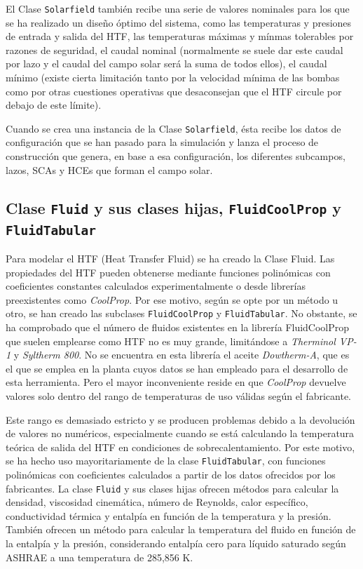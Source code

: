 El Clase \texttt{Solarfield} también recibe una serie de valores nominales para los que se ha realizado un diseño óptimo del sistema, como las temperaturas y presiones de entrada y salida del HTF, las temperaturas máximas y mínmas tolerables por razones de seguridad, el caudal nominal (normalmente se suele dar este caudal por lazo y el caudal del campo solar será la suma de todos ellos), el caudal mínimo (existe cierta limitación tanto por la velocidad mínima de las bombas como por otras
cuestiones operativas que desaconsejan que el HTF circule por debajo de este límite).

Cuando se crea una instancia de la Clase \texttt{Solarfield}, ésta recibe los datos de configuración que se han pasado para la simulación y lanza el proceso de construcción que genera, en base a esa configuración, los diferentes subcampos, lazos, SCAs y HCEs que forman el campo solar.

\subsection{Clase \texttt{Fluid} y sus clases hijas, \texttt{FluidCoolProp} y \texttt{FluidTabular}}
\label{subclases-fluid}

Para modelar el HTF (Heat Transfer Fluid) se ha creado la Clase Fluid. Las propiedades del HTF pueden obtenerse mediante funciones polinómicas con coeficientes constantes calculados experimentalmente o desde librerías preexistentes como \textit{CoolProp}. Por ese motivo, según se opte por un método u otro, se han creado las subclases \texttt{FluidCoolProp} y \texttt{FluidTabular}. No obstante, se ha comprobado que el número de fluidos existentes en la librería FluidCoolProp que suelen emplearse como HTF no es muy grande, limitándose a \emph{Therminol VP-1} y \emph{Syltherm 800}. No se encuentra en esta librería el aceite \emph{Dowtherm-A}, que es el que se emplea en la planta cuyos datos se han empleado para el desarrollo de esta herramienta. Pero el mayor inconveniente reside en que \emph{CoolProp} devuelve valores solo dentro del rango de temperaturas de uso válidas según el fabricante. 

Este rango es demasiado estricto y se producen problemas debido a la devolución de valores no numéricos, especialmente cuando se está calculando la temperatura teórica de salida del HTF en condiciones de sobrecalentamiento. Por este motivo, se ha hecho uso mayoritariamente de la clase \texttt{FluidTabular}, con funciones polinómicas con coeficientes calculados a partir de los datos ofrecidos por los fabricantes.  La clase \texttt{Fluid} y sus clases hijas ofrecen métodos para calcular la densidad, viscosidad cinemática, número de Reynolds, calor específico, conductividad térmica y entalpía en función de la temperatura y la presión. También ofrecen un método para calcular la temperatura del fluido en función de la entalpía y la presión, considerando entalpía cero para líquido saturado según ASHRAE a una temperatura de 285,856 K.

